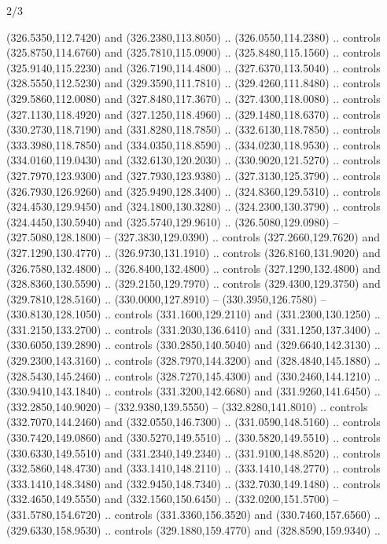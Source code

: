 \begin{flagdescription}{2/3}
\begin{scope}[xshift=0.5\flaglength,yshift=0.5\flagwidth,scale=\stretchfactor]
\begin{scope}[scale=0.001645\flagwidth,yshift=65mm,xshift=-63mm]
\begin{scope}[y=0.80pt, x=0.80pt, yscale=-1,]
\begin{scope}[cm={{1.33333,0.0,0.0,1.33333,(0.0,1e-05)}}]
  (326.5350,112.7420) and (326.2380,113.8050) .. (326.0550,114.2380) .. controls
  (325.8750,114.6760) and (325.7810,115.0900) .. (325.8480,115.1560) .. controls
  (325.9140,115.2230) and (326.7190,114.4800) .. (327.6370,113.5040) .. controls
  (328.5550,112.5230) and (329.3590,111.7810) .. (329.4260,111.8480) .. controls
  (329.5860,112.0080) and (327.8480,117.3670) .. (327.4300,118.0080) .. controls
  (327.1130,118.4920) and (327.1250,118.4960) .. (329.1480,118.6370) .. controls
  (330.2730,118.7190) and (331.8280,118.7850) .. (332.6130,118.7850) .. controls
  (333.3980,118.7850) and (334.0350,118.8590) .. (334.0230,118.9530) .. controls
  (334.0160,119.0430) and (332.6130,120.2030) .. (330.9020,121.5270) .. controls
  (327.7970,123.9300) and (327.7930,123.9380) .. (327.3130,125.3790) .. controls
  (326.7930,126.9260) and (325.9490,128.3400) .. (324.8360,129.5310) .. controls
  (324.4530,129.9450) and (324.1800,130.3280) .. (324.2300,130.3790) .. controls
  (324.4450,130.5940) and (325.5740,129.9610) .. (326.5080,129.0980) --
  (327.5080,128.1800) -- (327.3830,129.0390) .. controls (327.2660,129.7620) and
  (327.1290,130.4770) .. (326.9730,131.1910) .. controls (326.8160,131.9020) and
  (326.7580,132.4800) .. (326.8400,132.4800) .. controls (327.1290,132.4800) and
  (328.8360,130.5590) .. (329.2150,129.7970) .. controls (329.4300,129.3750) and
  (329.7810,128.5160) .. (330.0000,127.8910) -- (330.3950,126.7580) --
  (330.8130,128.1050) .. controls (331.1600,129.2110) and (331.2300,130.1250) ..
  (331.2150,133.2700) .. controls (331.2030,136.6410) and (331.1250,137.3400) ..
  (330.6050,139.2890) .. controls (330.2850,140.5040) and (329.6640,142.3130) ..
  (329.2300,143.3160) .. controls (328.7970,144.3200) and (328.4840,145.1880) ..
  (328.5430,145.2460) .. controls (328.7270,145.4300) and (330.2460,144.1210) ..
  (330.9410,143.1840) .. controls (331.3200,142.6680) and (331.9260,141.6450) ..
  (332.2850,140.9020) -- (332.9380,139.5550) -- (332.8280,141.8010) .. controls
  (332.7070,144.2460) and (332.0550,146.7300) .. (331.0590,148.5160) .. controls
  (330.7420,149.0860) and (330.5270,149.5510) .. (330.5820,149.5510) .. controls
  (330.6330,149.5510) and (331.2340,149.2340) .. (331.9100,148.8520) .. controls
  (332.5860,148.4730) and (333.1410,148.2110) .. (333.1410,148.2770) .. controls
  (333.1410,148.3480) and (332.9450,148.7340) .. (332.7030,149.1480) .. controls
  (332.4650,149.5550) and (332.1560,150.6450) .. (332.0200,151.5700) --
  (331.5780,154.6720) .. controls (331.3360,156.3520) and (330.7460,157.6560) ..
  (329.6330,158.9530) .. controls (329.1880,159.4770) and (328.8590,159.9340) ..

\end{scope}
\end{scope}
\end{scope}
\end{scope}
\end{flagdescription}
